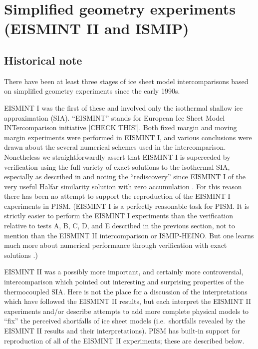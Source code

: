 \documentclass[12pt,final]{amsart}
\begin{document}
\clearpage\newpage
\section{Simplified geometry experiments (EISMINT II and ISMIP)}\label{sect:simp}

\subsection{Historical note}  There have been at least three stages of ice sheet model intercomparisons based on simplified geometry experiments since the early 1990s.

EISMINT I \cite{EISMINT96} was the first of these and involved only the isothermal shallow ice approximation (SIA).  ``EISMINT'' stands for European Ice Sheet Model INTercomparison initiative [CHECK THIS!].  Both fixed margin and moving margin experiments were performed in EISMINT I, and various conclusions were drawn about the several numerical schemes used in the intercomparison.  Nonetheless we straightforwardly assert that EISMINT I is superceded by verification using the full variety of exact solutions to the isothermal SIA, especially as described in \cite{BLKCB} and noting the ``rediscovery'' since EISMINT I of the very useful Halfar similarity solution with zero accumulation \cite{Halfar83}.  For this reason there has been no attempt to support the reproduction of the EISMINT I experiments in PISM.  (EISMINT I is a perfectly reasonable task for PISM.  It is strictly easier to perform the EISMINT I experiments than the verification relative to tests A, B, C, D, and E described in the previous section, not to mention than the EISMINT II intercomparison or ISMIP-HEINO.  But one learns much more about numerical performance through verification with exact solutions \cite{BLKCB}.)

EISMINT II \cite{EISMINT00} was a possibly more important, and certainly more controversial, intercomparison which pointed out interesting and surprising properties of the thermocoupled SIA.  Here is not the place for a discussion of the interpretations which have followed the EISMINT II results, but \cite{BBL,Hindmarsh04,Hindmarsh06,PayneBaldwin,SaitoEISMINT} each interpret the EISMINT II experiments and/or describe attempts to add more complete physical models to ``fix'' the perceived shortfalls of ice sheet models (i.e.~shortfalls revealed by the EISMINT II results and their interpretations).  PISM has built-in support for reproduction of all of the EISMINT II experiments; these are described below.
\end{document}
